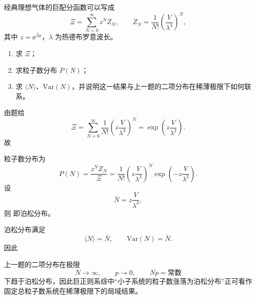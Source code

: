 \begin{question}[16分]
经典理想气体的巨配分函数可以写成
\[
\Xi=\sum_{N=0}^{\infty} z^N Z_N,
\qquad
Z_N=\frac{1}{N!}\left(\frac{V}{\lambda^3}\right)^N,
\]
其中 $z=\ee^{\beta\mu}$，$\lambda$ 为热德布罗意波长。
\begin{enumerate}[label=(\arabic*),leftmargin=2.8em,itemsep=0.2em]
\item 求 $\Xi$；
\item 求粒子数分布 $P(N)$；
\item 求 $\langle N\rangle$、$\mathrm{Var}(N)$，并说明这一结果与上一题的二项分布在稀薄极限下如何联系。
\end{enumerate}
\begin{solution}

由题给
\[
\Xi=\sum_{N=0}^{\infty}\frac{1}{N!}\left(z\frac{V}{\lambda^3}\right)^N
=\exp\!\left(z\frac{V}{\lambda^3}\right).
\]
故

粒子数分布为
\[
P(N)=\frac{z^N Z_N}{\Xi}
=\frac{1}{N!}\left(z\frac{V}{\lambda^3}\right)^N
\exp\!\left(-z\frac{V}{\lambda^3}\right).
\]
设
\[
\bar N=z\frac{V}{\lambda^3},
\]
则
即泊松分布。

泊松分布满足
\[
\langle N\rangle=\bar N,\qquad
\mathrm{Var}(N)=\bar N.
\]
因此

上一题的二项分布在极限
\[
N\to\infty,\qquad p\to0,\qquad Np=\text{常数}
\]
下趋于泊松分布，因此巨正则系综中“小子系统的粒子数涨落为泊松分布”正可看作固定总粒子数系统在稀薄极限下的局域结果。
\end{solution}
\end{question}

